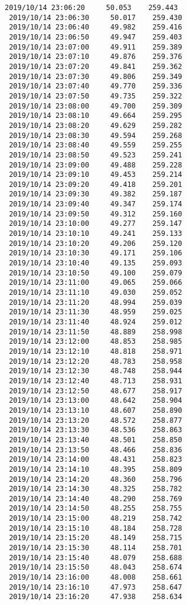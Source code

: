 \documentclass[11pt]{article}
\begin{document}
\begin{Verbatim}[commandchars=\\\{\}]
 2019/10/14 23:06:20     50.053    259.443
 2019/10/14 23:06:30     50.017    259.430
 2019/10/14 23:06:40     49.982    259.416
 2019/10/14 23:06:50     49.947    259.403
 2019/10/14 23:07:00     49.911    259.389
 2019/10/14 23:07:10     49.876    259.376
 2019/10/14 23:07:20     49.841    259.362
 2019/10/14 23:07:30     49.806    259.349
 2019/10/14 23:07:40     49.770    259.336
 2019/10/14 23:07:50     49.735    259.322
 2019/10/14 23:08:00     49.700    259.309
 2019/10/14 23:08:10     49.664    259.295
 2019/10/14 23:08:20     49.629    259.282
 2019/10/14 23:08:30     49.594    259.268
 2019/10/14 23:08:40     49.559    259.255
 2019/10/14 23:08:50     49.523    259.241
 2019/10/14 23:09:00     49.488    259.228
 2019/10/14 23:09:10     49.453    259.214
 2019/10/14 23:09:20     49.418    259.201
 2019/10/14 23:09:30     49.382    259.187
 2019/10/14 23:09:40     49.347    259.174
 2019/10/14 23:09:50     49.312    259.160
 2019/10/14 23:10:00     49.277    259.147
 2019/10/14 23:10:10     49.241    259.133
 2019/10/14 23:10:20     49.206    259.120
 2019/10/14 23:10:30     49.171    259.106
 2019/10/14 23:10:40     49.135    259.093
 2019/10/14 23:10:50     49.100    259.079
 2019/10/14 23:11:00     49.065    259.066
 2019/10/14 23:11:10     49.030    259.052
 2019/10/14 23:11:20     48.994    259.039
 2019/10/14 23:11:30     48.959    259.025
 2019/10/14 23:11:40     48.924    259.012
 2019/10/14 23:11:50     48.889    258.998
 2019/10/14 23:12:00     48.853    258.985
 2019/10/14 23:12:10     48.818    258.971
 2019/10/14 23:12:20     48.783    258.958
 2019/10/14 23:12:30     48.748    258.944
 2019/10/14 23:12:40     48.713    258.931
 2019/10/14 23:12:50     48.677    258.917
 2019/10/14 23:13:00     48.642    258.904
 2019/10/14 23:13:10     48.607    258.890
 2019/10/14 23:13:20     48.572    258.877
 2019/10/14 23:13:30     48.536    258.863
 2019/10/14 23:13:40     48.501    258.850
 2019/10/14 23:13:50     48.466    258.836
 2019/10/14 23:14:00     48.431    258.823
 2019/10/14 23:14:10     48.395    258.809
 2019/10/14 23:14:20     48.360    258.796
 2019/10/14 23:14:30     48.325    258.782
 2019/10/14 23:14:40     48.290    258.769
 2019/10/14 23:14:50     48.255    258.755
 2019/10/14 23:15:00     48.219    258.742
 2019/10/14 23:15:10     48.184    258.728
 2019/10/14 23:15:20     48.149    258.715
 2019/10/14 23:15:30     48.114    258.701
 2019/10/14 23:15:40     48.079    258.688
 2019/10/14 23:15:50     48.043    258.674
 2019/10/14 23:16:00     48.008    258.661
 2019/10/14 23:16:10     47.973    258.647
 2019/10/14 23:16:20     47.938    258.634

\end{Verbatim}
\end{document}
